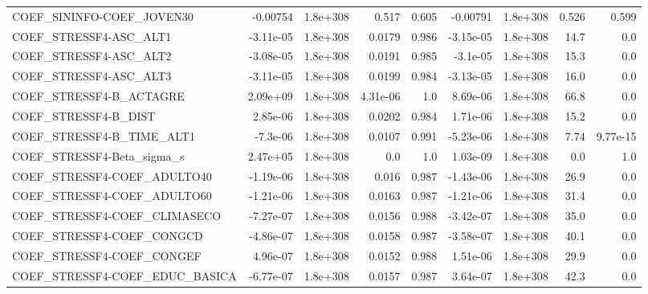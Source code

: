 \begin{tabular}{lrrrrrrrr}
COEF\_SININFO-COEF\_JOVEN30         &    -0.00754 &     1.8e+308 &     0.517 &    0.605 &   -0.00791 &    1.8e+308 &        0.526 &         0.599 \\
COEF\_STRESSF4-ASC\_ALT1            &   -3.11e-05 &     1.8e+308 &    0.0179 &    0.986 &  -3.15e-05 &    1.8e+308 &         14.7 &           0.0 \\
COEF\_STRESSF4-ASC\_ALT2            &   -3.08e-05 &     1.8e+308 &    0.0191 &    0.985 &   -3.1e-05 &    1.8e+308 &         15.3 &           0.0 \\
COEF\_STRESSF4-ASC\_ALT3            &   -3.11e-05 &     1.8e+308 &    0.0199 &    0.984 &  -3.13e-05 &    1.8e+308 &         16.0 &           0.0 \\
COEF\_STRESSF4-B\_ACTAGRE           &    2.09e+09 &     1.8e+308 &  4.31e-06 &      1.0 &   8.69e-06 &    1.8e+308 &         66.8 &           0.0 \\
COEF\_STRESSF4-B\_DIST              &    2.85e-06 &     1.8e+308 &    0.0202 &    0.984 &   1.71e-06 &    1.8e+308 &         15.2 &           0.0 \\
COEF\_STRESSF4-B\_TIME\_ALT1         &    -7.3e-06 &     1.8e+308 &    0.0107 &    0.991 &  -5.23e-06 &    1.8e+308 &         7.74 &      9.77e-15 \\
COEF\_STRESSF4-Beta\_sigma\_s        &    2.47e+05 &     1.8e+308 &       0.0 &      1.0 &   1.03e-09 &    1.8e+308 &          0.0 &           1.0 \\
COEF\_STRESSF4-COEF\_ADULTO40       &   -1.19e-06 &     1.8e+308 &     0.016 &    0.987 &  -1.43e-06 &    1.8e+308 &         26.9 &           0.0 \\
COEF\_STRESSF4-COEF\_ADULTO60       &   -1.21e-06 &     1.8e+308 &    0.0163 &    0.987 &  -1.21e-06 &    1.8e+308 &         31.4 &           0.0 \\
COEF\_STRESSF4-COEF\_CLIMASECO      &   -7.27e-07 &     1.8e+308 &    0.0156 &    0.988 &  -3.42e-07 &    1.8e+308 &         35.0 &           0.0 \\
COEF\_STRESSF4-COEF\_CONGCD         &   -4.86e-07 &     1.8e+308 &    0.0158 &    0.987 &  -3.58e-07 &    1.8e+308 &         40.1 &           0.0 \\
COEF\_STRESSF4-COEF\_CONGEF         &    4.96e-07 &     1.8e+308 &    0.0152 &    0.988 &   1.51e-06 &    1.8e+308 &         29.9 &           0.0 \\
COEF\_STRESSF4-COEF\_EDUC\_BASICA    &   -6.77e-07 &     1.8e+308 &    0.0157 &    0.987 &   3.64e-07 &    1.8e+308 &         42.3 &           0.0 \\

\end{tabular}
